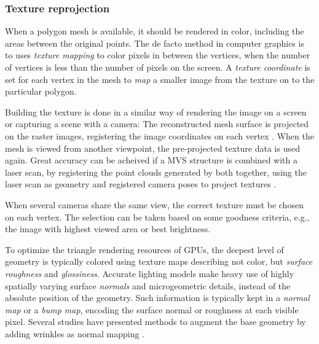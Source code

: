 \subsubsection{Texture reprojection} %

When a polygon mesh is available, it should be rendered in color, including the areas between the original points.
The de facto method in computer graphics is to uses \emph{texture mapping} to color pixels in between the vertices, when the number of vertices is less than the number of pixels on the screen.
A \emph{texture coordinate} is set for each vertex in the mesh to \emph{map} a smaller image from the texture on to the particular polygon. \cite{heckbert1986survey}

Building the texture is done in a similar way of rendering the image on a screen or capturing a scene with a camera:
The reconstructed mesh surface is projected on the raster images, registering the image coordinates on each vertex \cite[p. 610]{szeliski10vision} \cite[p. 98]{heyden2005multiple}.
When the mesh is viewed from another viewpoint, the pre-projected texture data is used again.
Great accuracy can be acheived if a MVS structure is combined with a laser scan, by registering the point clouds generated by both together, using the laser scan as geometry and registered camera poses to project textures \cite{liu2006multiview}.

When several cameras share the same view, the correct texture must be chosen on each vertex.
The selection can be taken based on some goodness criteria, e.g., the image with highest viewed area or best brightness.


To optimize the triangle rendering resources of GPUs, the deepest level of geometry is typically colored using texture maps describing not color, but \emph{surface roughness} and \emph{glossiness}.
Accurate lighting models make heavy use of highly spatially varying surface \emph{normals} and microgeometric details, instead of the absolute position of the geometry.
Such information is typically kept in a \emph{normal map} or a \emph{bump map}, encoding the surface normal or roughness at each visible pixel.
Several studies have presented methods to augment the base geometry by adding wrinkles as normal mapping \cite{bickel2007multi}.


